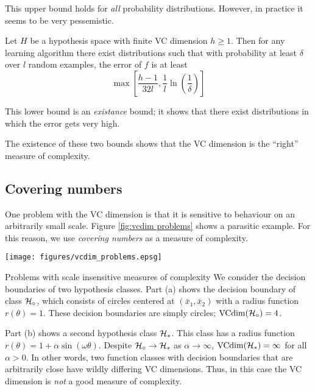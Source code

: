This upper bound holds for \emph{all} probability distributions.
However, in practice it seems to be very pessemistic.

\begin{theorem}
Let $H$ be a hypothesis space with finite VC dimension $h \geq 1$.
Then for any learning algorithm there exist distributions such that
with probability at least $\delta$ over $l$ random examples, the error
of $f$ is at least
\begin{equation}
\max \left[ \frac{h-1}{32l}, \frac{1}{l} \ln \left( \frac{1}{\delta}
\right) \right]
\end{equation}
\end{theorem}

This lower bound is an \emph{existance} bound; it shows that there
exist distributions in which the error gets very high.

The existence of these two bounds shows that the VC dimension is the
``right'' measure of complexity.  



\subsection{Covering numbers}

One problem with the VC dimension is that it is sensitive to behaviour
on an arbitrarily small scale.  Figure \ref{fig:vcdim problems} shows
a parasitic example.  For this reason, we use \emph{covering numbers}
as a measure of complexity.

\begin{linefigure}
\begin{center}
\texttt{[image: figures/vcdim\_problems.epsg]}
\end{center}
\begin{capt}{Problems with scale insensitive measures of complexity}
We consider the decision boundaries of two hypothesis classes.  Part
(a) shows the decision boundary of class $\mathcal{H}_{\circ}$,
which consists of circles centered at $(\bar{x}_1, \bar{x}_2)$ with a
radius function $r(\theta) = 1$.  These decision boundaries are simply
circles; $\mathrm{VCdim}(\mathcal{H}_{\circ}) = 4$.

Part (b) shows a second hypothesis class $\mathcal{H}_{\ast}$.  This class
has a radius function $r(\theta) = 1 + \alpha \sin(\omega \theta)$.
Despite $\mathcal{H}_{\circ} \rightarrow \mathcal{H}_{\ast}$ as $\alpha
\rightarrow \infty$, $\mathrm{VCdim}(\mathcal{H}_{\ast}) = \infty$ for all $\alpha >
0$.  In other words, two function classes with decision boundaries
that are arbitrarily close have wildly differing VC dimensions.  Thus,
in this case the VC dimension is \emph{not} a good measure of
complexity.
\end{capt}
\label{fig:vcdim problems}
\end{linefigure}

